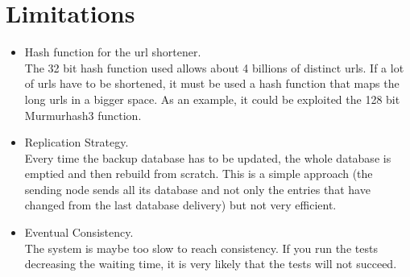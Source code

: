 \documentclass{article}
\begin{document}
\section{Limitations} 
\begin{itemize}
\item Hash function for the url shortener. \\
The 32 bit hash function used allows about 4 billions of distinct urls. If a lot of urls have to be shortened, it must be used a hash function that maps the long urls in a bigger space. As an example, it could be exploited the 128 bit Murmurhash3 function.
\item Replication Strategy. \\
Every time the backup database has to be updated, the whole database is emptied and then rebuild from scratch. This is a simple approach (the sending node sends all its database and not only the entries that have changed from the last database delivery) but not very efficient.
\item Eventual Consistency. \\
The system is maybe too slow to reach consistency. If you run the tests decreasing the waiting time, it is very likely that the tests will not succeed.
\end{itemize}
\end{document}
